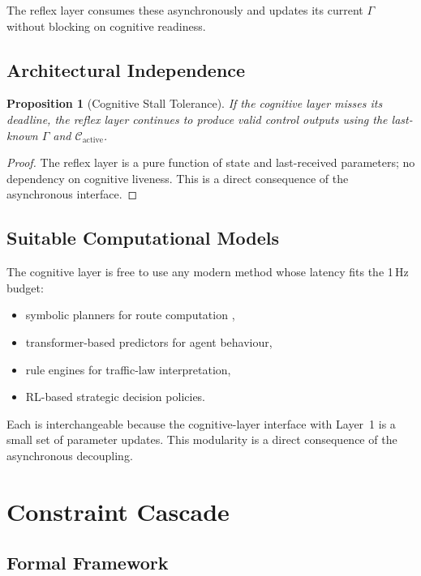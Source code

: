 \documentclass[11pt,twocolumn]{article}
\newtheorem{proposition}[theorem]{Proposition}
\theoremstyle{definition}
\theoremstyle{remark}
\newcommand{\cC}{\mathcal{C}}
\begin{document}
The reflex layer consumes these asynchronously and updates its current $\Gamma$ without blocking on cognitive readiness.

\subsection{Architectural Independence}

\begin{proposition}[Cognitive Stall Tolerance]\label{prop:stall}
If the cognitive layer misses its deadline, the reflex layer continues to produce valid control outputs using the last-known $\Gamma$ and $\cC_{\mathrm{active}}$.
\end{proposition}

\begin{proof}
The reflex layer is a pure function of state and last-received parameters; no dependency on cognitive liveness. This is a direct consequence of the asynchronous interface.
\end{proof}

\subsection{Suitable Computational Models}

The cognitive layer is free to use any modern method whose latency fits the 1\,Hz budget:
\begin{itemize}[leftmargin=*,itemsep=2pt]
\item symbolic planners for route computation \cite{russell2020artificial},
\item transformer-based predictors for agent behaviour,
\item rule engines for traffic-law interpretation,
\item RL-based strategic decision policies.
\end{itemize}

Each is interchangeable because the cognitive-layer interface with Layer~1 is a small set of parameter updates. This modularity is a direct consequence of the asynchronous decoupling.

\section{Constraint Cascade}
\label{sec:constraint-cascade}

\subsection{Formal Framework}
\end{document}
